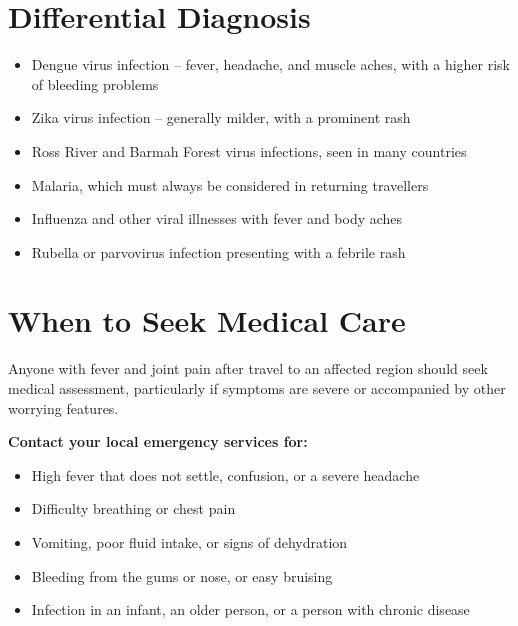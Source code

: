 \section*{Differential Diagnosis}
\begin{itemize}
    \item Dengue virus infection -- fever, headache, and muscle aches, with a higher risk of bleeding problems
    \item Zika virus infection -- generally milder, with a prominent rash
    \item Ross River and Barmah Forest virus infections, seen in many countries
    \item Malaria, which must always be considered in returning travellers
    \item Influenza and other viral illnesses with fever and body aches
    \item Rubella or parvovirus infection presenting with a febrile rash
\end{itemize}

\section*{When to Seek Medical Care}
Anyone with fever and joint pain after travel to an affected region should seek medical assessment, particularly if symptoms are severe or accompanied by other worrying features.

\medskip
\textbf{Contact your local emergency services for:}
\begin{itemize}
    \item High fever that does not settle, confusion, or a severe headache
    \item Difficulty breathing or chest pain
    \item Vomiting, poor fluid intake, or signs of dehydration
    \item Bleeding from the gums or nose, or easy bruising
    \item Infection in an infant, an older person, or a person with chronic disease
\end{itemize}

